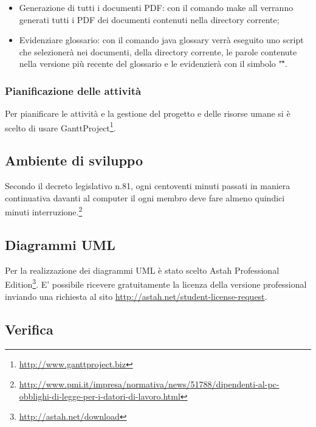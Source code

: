 \begin{itemize}
	\item Generazione di tutti i documenti PDF: con il comando make all verranno generati tutti i PDF dei documenti contenuti nella directory corrente;
	\item Evidenziare glossario: con il comando java glossary verrà eseguito uno script che selezionerà nei documenti, della directory corrente, le parole contenute nella versione più recente del glossario e le evidenzierà con il simbolo "\G".

\end{itemize}

\subsubsection{Pianificazione delle attività}
Per pianificare le attività e la gestione del progetto e delle risorse umane si è scelto di usare GanttProject\footnote{\url{http://www.ganttproject.biz}}.

\subsection{Ambiente di sviluppo}
Secondo il decreto legislativo n.81, ogni centoventi minuti passati in maniera continuativa davanti al computer il ogni membro deve fare almeno quindici minuti interruzione.\footnote{\url{http://www.pmi.it/impresa/normativa/news/51788/dipendenti-al-pc-obblighi-di-legge-per-i-datori-di-lavoro.html}}

\subsection{Diagrammi UML}

Per la realizzazione dei diagrammi UML è stato scelto Astah Professional Edition\footnote{\url{http://astah.net/download}}.
E' possibile ricevere gratuitamente la licenza della versione professional inviando una richiesta al sito \url{http://astah.net/student-license-request}.

\subsection{Verifica}

